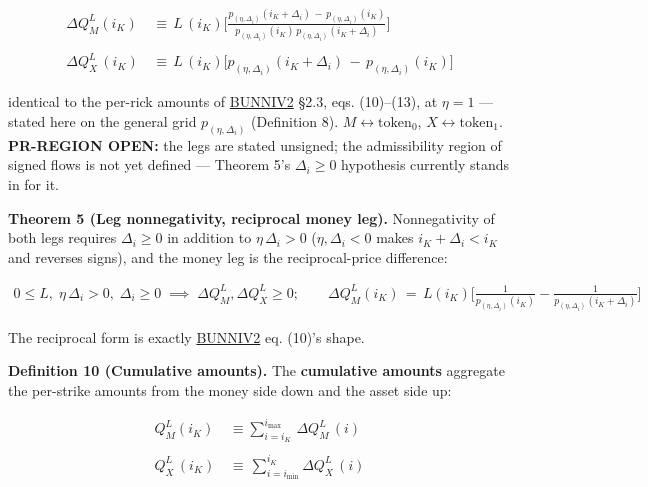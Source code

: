 \documentclass[11pt]{article}
\renewcommand{\_}{\textunderscore\allowbreak}
\begin{document}
\[
    \begin{aligned}
        \Delta Q_M^{L} (i_K) \, &\equiv \, L \, (i_K) \Big [ \frac{p_{(\eta, \Delta_i)} (i_K + \Delta_i) \, - \, p_{(\eta, \Delta_i)} (i_K)}{p_{(\eta, \Delta_i)} (i_K) \, p_{(\eta, \Delta_i)} (i_K + \Delta_i)}\Big] \\
        \\
        \Delta Q_X^L \, (i_K) \, &\equiv \, L \, (i_K) \Big [ p_{(\eta, \Delta_i)} (i_K + \Delta_i) \, - \, p_{(\eta, \Delta_i)} (i_K) \Big ]
    \end{aligned}
\]

identical to the per-rick amounts of \href{../refs/bunni-v2.pdf}{BUNNI\_V2} §2.3, eqs. (10)--(13), at \(\eta = 1\) --- stated here on the general grid \(p_{(\eta,\Delta_i)}\) (Definition 8). \(M \leftrightarrow \text{token}_0\), \(X \leftrightarrow \text{token}_1\). \textbf{PR-REGION OPEN:} the legs are stated unsigned; the admissibility region of signed flows is not yet defined --- Theorem 5's \(\Delta_i \geq 0\) hypothesis currently stands in for it.

\textbf{Theorem 5 (Leg nonnegativity, reciprocal money leg).} Nonnegativity of both legs requires \(\Delta_i \geq 0\) in addition to \(\eta\,\Delta_i > 0\) (\(\eta,\Delta_i < 0\) makes \(i_K + \Delta_i < i_K\) and reverses signs), and the money leg is the reciprocal-price difference:

\[
    \begin{aligned}
        0 \leq L, \; \eta\,\Delta_i > 0, \; \Delta_i \geq 0 \;\implies\; \Delta Q_M^L, \Delta Q_X^L \geq 0; \qquad
        \Delta Q_M^{L}(i_K) \, = \, L(i_K)\Big[\frac{1}{p_{(\eta, \Delta_i)}(i_K)} - \frac{1}{p_{(\eta, \Delta_i)}(i_K+\Delta_i)}\Big]
    \end{aligned}
\]

The reciprocal form is exactly \href{../refs/bunni-v2.pdf}{BUNNI\_V2} eq. (10)'s shape.

\textbf{Definition 10 (Cumulative amounts).} The \textbf{cumulative amounts} aggregate the per-strike amounts from the money side down and the asset side up:

\[
    \begin{aligned}
        Q_M^L (i_K) \, &\equiv \sum_{i=i_K}^{i_{\text{max}}} \, \Delta Q_M^{L}\, (i) \\
        \\
        Q_X^L \, (i_K) \, &\equiv \, \sum_{i=i_{\text{min}}}^{i_K} \Delta Q_X^L \, (i)
    \end{aligned}
\]
\end{document}
